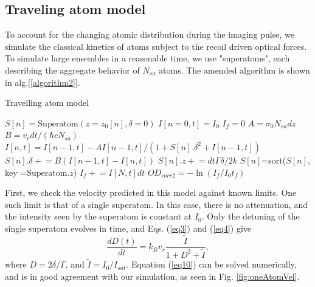 \documentclass[12pt]{iopart}
\begin{document}
\subsection{Traveling atom model}
To account for the changing atomic distribution during the imaging pulse, we simulate the classical kinetics of atoms subject to the recoil driven optical forces. To simulate large ensembles in a reasonable time, we use "superatoms",  each describing the aggregate behavior of $N_{sa}$ atoms. The amended algorithm is shown in alg.[\ref{algorithm2}]. 
\begin{algorithm}
\caption{Travelling atom model}
\label{algorithm2}
\begin{algorithmic}
\STATE $S[n]=\mathrm{Superatom}(z=z_0[n], \delta=0)$  
\STATE $I[n=0,t]=I_0$  
\STATE $I_f=0$
 \STATE $A=\sigma_0 N_{sa} dz$
 \STATE $B=v_r dt/(\hbar c  N_{sa})$ 
\STATE $I[n,t]=I[n-1,t] - A I[n-1,t]/(1+S[n].\delta^2+I[n-1,t])$  
\STATE $S[n].\delta\mathrel{+}=B\left(I[n-1,t]-I[n,t]\right)$   
\STATE $S[n].z\mathrel{+}=dt\Gamma\delta/2k$ 
\ENDFOR 
\STATE $S[n]$=sort($S[n]$, key =$\mathrm{ Superatom}.z$) 
\STATE $I_f  \mathrel{+}= I[N,t]dt$
\ENDFOR
\STATE $OD_{corr2}=-\ln{(I_f/I_0t_f)}$
\end{algorithmic}
\end{algorithm}
\par First, we check the velocity predicted in this model against known limits. One such limit is that of a single superatom. In this case, there is no attenuation, and the intensity seen by the superatom is constant at $I_0$. Only the detuning of the single superatom evolves in time, and Eqs. (\ref{eq3}) and (\ref{eq4}) give
\begin{equation}
\frac{dD(t)}{dt}= k_R v_r \frac{\tilde{I}}{1+D^2+\tilde{I}},
\label{eq10}
\end{equation}
where $D = 2\delta/\Gamma$, and $\tilde{I} = I_0/I_{sat}$. Equation (\ref{eq10}) can be solved numerically, and is in good agreement with our simulation, as seen in Fig. \ref{fig:oneAtomVel}.
\end{document}

